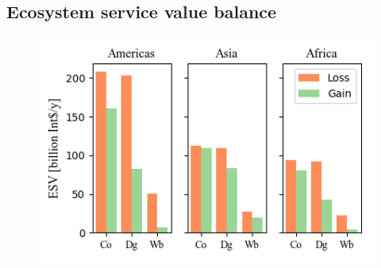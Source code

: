 \subsection{Ecosystem service value balance}
	\begin{figure}[ht]
		\centering
		\includegraphics[scale=1]{img/esv}
		\caption[Ecosystem service values]{}
		\label{fig:esv}
	\end{figure}

